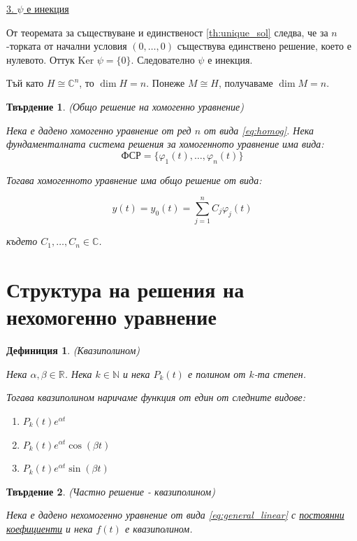 \documentclass{scrartcl}
\newtheorem{definition}{Дефиниция}
\newtheorem{statement}{Твърдение}
\begin{document}
\begin{FlushLeft}
\underline{3. $\psi$ е инекция}

От теоремата за съществуване и единственост \ref{th:unique_sol} следва, че за $n$-торката от начални условия $(0, \dots, 0)$ съществува единствено решение, което е нулевото. Оттук $\text{Ker }\psi = \{0\}$. Следователно $\psi$ е инекция.

Тъй като $H \cong \mathbb{C}^n$, то $\dim H = n$.
Понеже $M \cong H$, получаваме $\dim M = n$.

\begin{statement}\label{st:general_solution}
(Общо решение на хомогенно уравнение)

Нека е дадено хомогенно уравнение от ред $n$ от вида \eqref{eq:homog}.
Нека фундаменталната система решения за хомогенното уравнение има вида:
$$\text{ФСР} = \{\varphi_1(t), \dots, \varphi_n(t)\}$$

Тогава хомогенното уравнение има общо решение от вида:

$$y(t) = y_0(t) = \sum_{j=1}^n C_j \varphi_j(t)$$

където $C_1, \dots, C_n \in \mathbb{C}$.
\end{statement}

\section{Структура на решения на нехомогенно уравнение}

\begin{definition}
(Квазиполином)

Нека $\alpha, \beta \in \mathbb{R}$. Нека $k \in \mathbb{N}$ и нека $P_k(t)$ е полином от $k$-та степен.

Тогава квазиполином наричаме функция от един от следните видове:

\begin{enumerate}
    \item $P_k(t)e^{\alpha t}$
    \item $P_k(t)e^{\alpha t}\cos{(\beta t)}$
    \item $P_k(t)e^{\alpha t}\sin{(\beta t)}$
\end{enumerate}
\end{definition}

\begin{statement}
(Частно решение - квазиполином)

Нека е дадено нехомогенно уравнение от вида \eqref{eq:general_linear} с \underline{постоянни коефициенти} и нека $f(t)$ е квазиполином.


\end{statement}
\end{FlushLeft}
\end{document}
